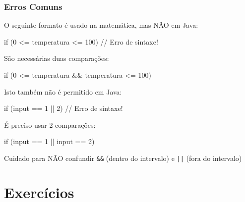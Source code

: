 \documentclass[xcolor={dvipsnames,table},aspectratio=169]{beamer}
\begin{document}
\begin{frame}[fragile]\frametitle{Erros Comuns}
\begin{itemize}
{\small
	\item O seguinte formato é usado na matemática, mas NÃO em Java:\\
\begin{javacode}
if (0 <= temperatura <= 100)  // Erro de sintaxe!
\end{javacode}
São necessárias duas comparações:\\
\begin{javacode}
if (0 <= temperatura && temperatura <= 100) 
\end{javacode}
	\item Isto também não é permitido em Java:\\
\begin{javacode}
if (input == 1 || 2)  // Erro de sintaxe!
\end{javacode}
É preciso usar 2 comparações:\\
\begin{javacode}
if (input == 1 || input == 2)
\end{javacode}
	\item Cuidado para NÃO confundir \texttt{\&\&} (dentro do intervalo) e \texttt{||} (fora do intervalo)
}
\end{itemize}
\end{frame}

\section{Exercícios}
\end{document}
